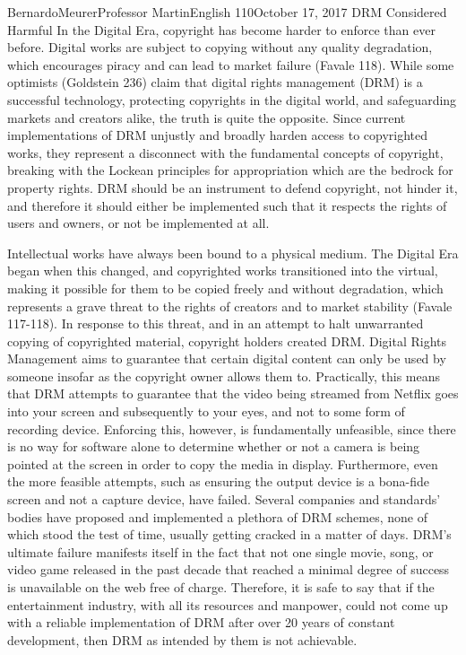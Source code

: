 \documentclass[12pt,letterpaper]{article}
\begin{document}
        \begin{mla}{Bernardo}{Meurer}{Professor Martin}{English 110}{October 17, 2017}%
            {DRM Considered Harmful}
        In the Digital Era, copyright has become harder to enforce than ever before. Digital works are subject to copying without any quality degradation, which encourages piracy and can lead to market failure (Favale 118). While some optimists (Goldstein 236) claim that digital rights management (DRM) is a successful technology, protecting copyrights in the digital world, and safeguarding markets and creators alike, the truth is quite the opposite. Since current implementations of DRM unjustly and broadly harden access to copyrighted works, they represent a disconnect with the fundamental concepts of copyright, breaking with the Lockean principles for appropriation which are the bedrock for property rights. DRM should be an instrument to defend copyright, not hinder it, and therefore it should either be implemented such that it respects the rights of users and owners, or not be implemented at all.

        Intellectual works have always been bound to a physical medium. The Digital Era began when this changed, and copyrighted works transitioned into the virtual, making it possible for them to be copied freely and without degradation, which represents a grave threat to the rights of creators and to market stability (Favale 117-118). In response to this threat, and in an attempt to halt unwarranted copying of copyrighted material, copyright holders created DRM. Digital Rights Management aims to guarantee that certain digital content can only be used by someone insofar as the copyright owner allows them to. Practically, this means that DRM attempts to guarantee that the video being streamed from Netflix goes into your screen and subsequently to your eyes, and not to some form of recording device. Enforcing this, however, is fundamentally unfeasible, since there is no way for software alone to determine whether or not a camera is being pointed at the screen in order to copy the media in display. Furthermore, even the more feasible attempts, such as ensuring the output device is a bona-fide screen and not a capture device, have failed. Several companies and standards' bodies have proposed and implemented a plethora of DRM schemes, none of which stood the test of time, usually getting cracked in a matter of days. DRM's ultimate failure manifests itself in the fact that not one single movie, song, or video game released in the past decade that reached a minimal degree of success is unavailable on the web free of charge. Therefore, it is safe to say that if the entertainment industry, with all its resources and manpower, could not come up with a reliable implementation of DRM after over 20 years of constant development, then DRM as intended by them is not achievable.


\end{mla}
\end{document}
